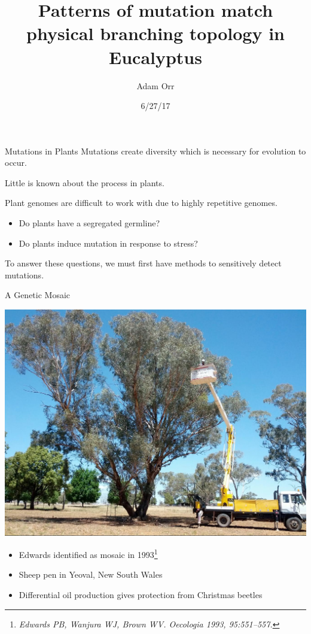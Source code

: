 \documentclass{beamer}
\title[Eucalyptus Mutation Topology]{Patterns of mutation match physical branching topology in Eucalyptus}
\date{6/27/17}
\author{Adam Orr}
\begin{document}
\frame{\titlepage}

\begin{frame}{Mutations in Plants}
	Mutations create diversity which is necessary for evolution to occur.

	Little is known about the process in plants.

	Plant genomes are difficult to work with due to highly repetitive genomes.

	\begin{itemize}
		\item Do plants have a segregated germline?
		\item Do plants induce mutation in response to stress?
	\end{itemize}

	To answer these questions, we must first have methods to sensitively detect mutations.

\end{frame}

\begin{frame}{A Genetic Mosaic}
	\begin{center}
	\includegraphics[width=.6\linewidth]{unlabeled_tree.jpg}
	\end{center}
	\begin{itemize}
		\item Edwards identified as mosaic in 1993\footnote{\textit{Edwards PB, Wanjura WJ, Brown WV. Oecologia 1993, 95:551–557.}}
		\item Sheep pen in Yeoval, New South Wales
		\item Differential oil production gives protection from Christmas beetles
	\end{itemize}
\end{frame}
\end{document}
